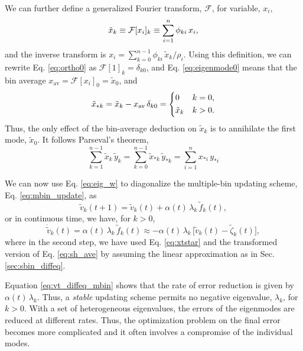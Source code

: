 \documentclass[reprint, superscriptaddress, floatfix]{revtex4-1}
\newcommand{\bav}[1]{#1_\mathrm{av}}
\begin{document}
We can further define
a generalized Fourier transform, $\mathcal{F}$,
for variable, $x_i$,
%
\begin{equation}
  {\tilde x}_k
  \equiv \mathcal{F}[x_i]_k
  \equiv \sum_{i = 1}^n \phi_{ki} \, x_i
  ,
  \notag
\end{equation}
%
and the inverse transform is
$x_i = \sum_{k = 0}^{n-1} \phi_{ki} \, \tilde{x}_k / \rho_i$.
%
%
Using this definition,
we can rewrite Eq. \eqref{eq:ortho0} as
$\mathcal F[1]_k = \delta_{k0}$,
%
and Eq. \eqref{eq:eigenmode0} means that
the bin average
$\bav{x}= \mathcal F[x_i]_0 = \tilde x_0$,
%
and
\begin{equation}
  \tilde x_{*k}
  = \tilde x_k - \bav{x} \, \delta_{k0}
  =
  \begin{dcases}
    0           & k = 0
    ,
    \\
    \tilde x_k  & k > 0
    .
  \end{dcases}
  \label{eq:xtstar}
\end{equation}
%
Thus, the only effect
of the bin-average deduction on $\tilde x_k$ is to
annihilate the first mode, $\tilde x_0$.
%
It follows Parseval's theorem,
\begin{equation}
  \sum_{k=1}^{n-1} \tilde x_k \, \tilde y_k
  =
  \sum_{k=0}^{n-1} \tilde x_{*k} \, \tilde y_{*k}
  =
  \sum_{i=1}^n x_{*i} \, y_{*i}
  \label{eq:parseval}
\end{equation}

We can now use Eq. \eqref{eq:eig_w} to diagonalize
the multiple-bin updating scheme, Eq. \eqref{eq:mbin_update},
as
%
$$
{\tilde v}_k(t + 1) =
{\tilde v}_k(t) + \alpha(t) \, \lambda_k \,
{\tilde f}_k(t)
,
$$
or in continuous time, we have, for $k > 0$,
%
\begin{equation}
  \dot{\tilde v}_k(t)
  =
  \alpha(t) \, \lambda_k \, {\tilde f}_k(t)
  \approx
  -\alpha(t) \, \lambda_k \,
  \bigl[ {\tilde v}_k(t) - {\tilde \zeta}_k(t) \bigr]
  ,
  \label{eq:vt_diffeq_mbin}
\end{equation}
%
where in the second step,
we have used Eq. \eqref{eq:xtstar} and
the transformed version of Eq. \eqref{eq:sh_ave}
by assuming the linear approximation
as in Sec. \ref{sec:sbin_diffeq}.

Equation \eqref{eq:vt_diffeq_mbin}
shows that the rate of error reduction
is given by $\alpha(t) \, \lambda_k$.
%
Thus, a \emph{stable} updating scheme
permits no negative eigenvalue, $\lambda_k$,
for $k > 0$.
%
With a set of heterogeneous eigenvalues,
the errors of the eigenmodes are reduced at different rates.
%
Thus, the optimization problem on the final error
becomes more complicated and it often
involves a compromise of the individual modes.
\end{document}
